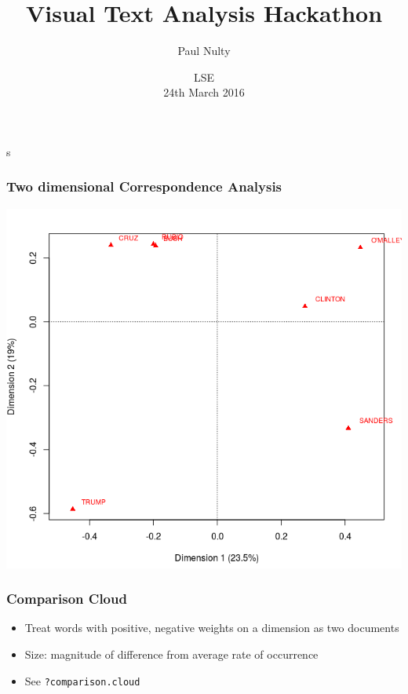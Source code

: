 \documentclass[11pt, table, dvipsnames]{beamer}
\title[Visual Text Analysis Hackathon]{Visual Text Analysis Hackathon}
\author{Paul Nulty}
\date %
{LSE \\ 
24th March 2016}
\begin{document}
\begin{frame}%
\titlepage
s\end{frame}

\begin{frame}
  \frametitle{Two dimensional Correspondence Analysis}
  \includegraphics[scale=0.35]{2DCA}\\
\end{frame}


\begin{frame}
  \frametitle{Comparison Cloud}
 \begin{itemize}
  \item Treat words with positive, negative weights on a dimension as two documents
  \item Size: magnitude of difference from average rate of occurrence
  \item See \texttt{?comparison.cloud}
  \end{itemize}
\end{frame}
\end{document}

